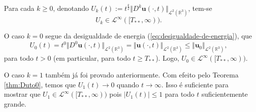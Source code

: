 \documentclass[a4paper, 11pt]{book}
\theoremstyle{definition}
\newcommand{\bR}{\mathbb{R}}
\newcommand{\bu}{\mathbf{u}}
\newcommand{\cL}{\mathcal{L}}
\begin{document}
\begin{lbox} \label{lm:uk}
    Para cada $k \geqslant 0$, denotando $U_k(t) := t^{\frac{k}{2}} \Vert D^k \bu(\cdot,t) \Vert_{\cL^2(\bR^3)}$, tem-se
    \[
        U_k \in \cL^\infty([T_{**}, \infty)).
    \]
\end{lbox}
\begin{prf}
    O caso $k = 0$ segue da desigualdade de energia (\ref{eq:desigualdade-de-energia}), que
    \[
        U_0(t) =t^0 \Vert D^0\bu(\cdot,t) \Vert_{\cL^2(\bR^3)} = \Vert \bu(\cdot,t) \Vert_{\cL^2(\bR^3)} \leqslant \Vert \bu_0 \Vert_{\cL^2(\bR^3)},
    \]
    para todo $t > 0$ (em particular, para todo $t \geqslant T_{**}$). Logo, $U_0 \in \cL^{\infty}([T_{**}, \infty))$.

    O caso $k = 1$ também já foi provado anteriormente. Com efeito
    pelo Teorema \ref{thm:Duto0}, temos que $U_1(t) \to 0$ quando $t \to \infty$. Isso é suficiente para mostrar que $U_1 \in \cL^\infty([T_{**}, \infty))$ pois $|U_1(t)| \leqslant 1$ para todo $t$ suficientemente grande.


\end{prf}
\end{document}
